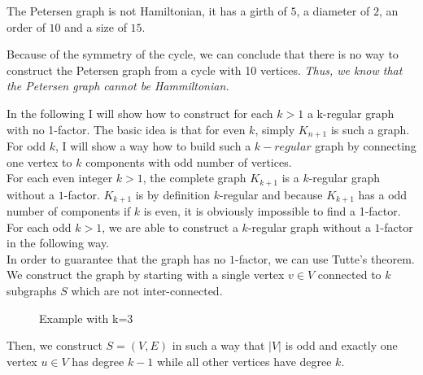 \documentclass[a4paper]{article}
\begin{document}
\begin{solution}{9}
\begin{theorem}{The Petersen graph is not Hamiltonian, it has a girth of $5$, a diameter of $2$, an order of $10$ and a size of $15$.}
\begin{itemize}
\begin{center}
					\end{center}
			\end{itemize}
			Because of the symmetry of the cycle, we can conclude that there is no way to construct the Petersen graph from a cycle with 10 vertices.
			\emph{Thus, we know that the Petersen graph cannot be Hammiltonian.}
		\end{theorem}
	\end{solution}
	\newpage
	\begin{solution}{11}
		In the following I will show how to construct for each $k>1$ a k-regular graph with no 1-factor. 
		The basic idea is that for even $k$, simply $K_{n+1}$ is such a graph. 
		For odd $k$,  I will show a way how to build such a $k-regular$ graph by connecting one vertex to $k$ components with odd number of vertices.  \\ 
		
		
		For each even integer $k > 1$, the complete graph $K_{k+1}$ is a $k$-regular graph without a $1$-factor. 
		$K_{k+1}$ is by definition $k$-regular and because $K_{k+1}$ has a odd number of components if $k$ is even, it is obviously impossible to find a 1-factor. 
		For each odd $k > 1$, we are able to construct a $k$-regular graph without a $1$-factor in the following way. \\
		
		In order to guarantee that the graph has no $1$-factor, we can use Tutte's theorem. We construct the graph by starting with a single vertex $v \in V$ connected to $k$ subgraphs $S$ which are not inter-connected. 
		\begin{figure}[h]
			\centering
		\caption{Example with k=3}
		\end{figure}
		Then, we construct $S=(V,E)$ in such a way that $|V|$ is odd and exactly one vertex $u \in V$ has degree $k-1$ while all other vertices have degree $k$.
 

\end{solution}
\end{document}
